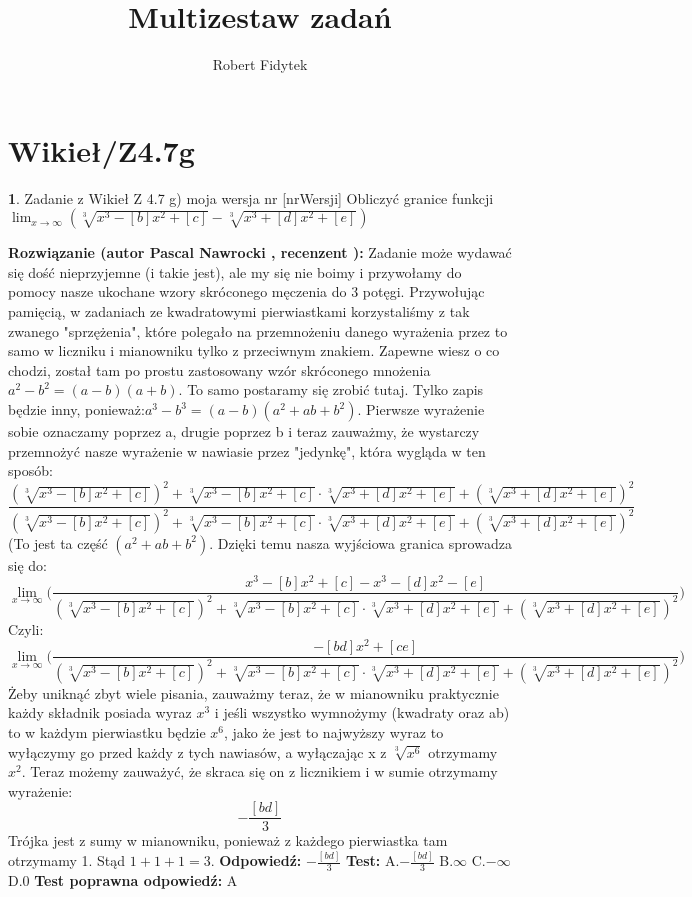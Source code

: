 \documentclass[12pt, a4paper]{article}
\title{Multizestaw zadań}
\author{Robert Fidytek}
\date{}
\theoremstyle{definition} %
\newtheorem{zad}{}
\newcommand{\kategoria}[1]{\section{#1}} %
\newcommand{\zadStart}[1]{\begin{zad}#1\newline} %
\newcommand{\zadStop}{\end{zad}}   %
\newcommand{\rozwStart}[2]{\noindent \textbf{Rozwiązanie (autor #1 , recenzent #2): }\newline} %
\newcommand{\rozwStop}{\newline}                                            %
\newcommand{\odpStart}{\noindent \textbf{Odpowiedź:}\newline}    %
\newcommand{\odpStop}{\newline}                                             %
\newcommand{\testStart}{\noindent \textbf{Test:}\newline} %
\newcommand{\testStop}{\newline} %
\newcommand{\kluczStart}{\noindent \textbf{Test poprawna odpowiedź:}\newline} %
\newcommand{\kluczStop}{\newline} %
\begin{document}
\maketitle


\kategoria{Wikieł/Z4.7g}
\zadStart{Zadanie z Wikieł Z 4.7 g) moja wersja nr [nrWersji]}
Obliczyć granice funkcji $\displaystyle{\lim_{x \to \infty}}(\sqrt[3]{x^3-[b]x^2+[c]}-\sqrt[3]{x^3+[d]x^2+[e]})$
\zadStop
\rozwStart{Pascal Nawrocki}{}
Zadanie może wydawać się dość nieprzyjemne (i takie jest), ale my się nie boimy i przywołamy do pomocy nasze ukochane wzory skróconego męczenia do 3 potęgi. Przywołując pamięcią, w zadaniach ze kwadratowymi pierwiastkami korzystaliśmy z tak zwanego "sprzężenia", które polegało na przemnożeniu danego wyrażenia przez to samo w liczniku i mianowniku tylko z przeciwnym znakiem. Zapewne wiesz o co chodzi, został tam po prostu zastosowany wzór skróconego mnożenia $a^2-b^2=(a-b)(a+b)$. To samo postaramy się zrobić tutaj. Tylko zapis będzie inny, ponieważ:$a^3-b^3=(a-b)(a^2+ab+b^2)$. Pierwsze wyrażenie sobie oznaczamy poprzez a, drugie poprzez b i teraz zauważmy, że wystarczy przemnożyć nasze wyrażenie w nawiasie przez "jedynkę", która wygląda w ten sposób:
$$\frac{(\sqrt[3]{x^3-[b]x^2+[c]})^2+\sqrt[3]{x^3-[b]x^2+[c]}\cdot\sqrt[3]{x^3+[d]x^2+[e]}+(\sqrt[3]{x^3+[d]x^2+[e]})^2}{(\sqrt[3]{x^3-[b]x^2+[c]})^2+\sqrt[3]{x^3-[b]x^2+[c]}\cdot\sqrt[3]{x^3+[d]x^2+[e]}+(\sqrt[3]{x^3+[d]x^2+[e]})^2}$$
(To jest ta część $(a^2+ab+b^2)$.
Dzięki temu nasza wyjściowa granica sprowadza się do:
$$\displaystyle{\lim_{x \to \infty}}\bigg(\frac{x^3-[b]x^2+[c]-x^3-[d]x^2-[e]}{(\sqrt[3]{x^3-[b]x^2+[c]})^2+\sqrt[3]{x^3-[b]x^2+[c]}\cdot\sqrt[3]{x^3+[d]x^2+[e]}+(\sqrt[3]{x^3+[d]x^2+[e]})^2}\bigg)$$
Czyli:
$$\displaystyle{\lim_{x \to \infty}}\bigg(\frac{-[bd]x^2+[ce]}{(\sqrt[3]{x^3-[b]x^2+[c]})^2+\sqrt[3]{x^3-[b]x^2+[c]}\cdot\sqrt[3]{x^3+[d]x^2+[e]}+(\sqrt[3]{x^3+[d]x^2+[e]})^2}\bigg)$$
Żeby uniknąć zbyt wiele pisania, zauważmy teraz, że w mianowniku praktycznie każdy składnik posiada wyraz $x^3$ i jeśli wszystko wymnożymy (kwadraty oraz ab) to w każdym pierwiastku będzie $x^6$, jako że jest to najwyższy wyraz to wyłączymy go przed każdy z tych nawiasów, a wyłączając x z $\sqrt[3]{x^6}$ otrzymamy $x^2$. Teraz możemy zauważyć, że skraca się on z licznikiem i w sumie otrzymamy wyrażenie:
$$-\frac{[bd]}{3}$$ Trójka jest z sumy w mianowniku, ponieważ z każdego pierwiastka tam otrzymamy 1. Stąd $1+1+1=3$.
\rozwStop
\odpStart
$-\frac{[bd]}{3}$
\odpStop
\testStart
A.$-\frac{[bd]}{3}$
B.$\infty$
C.$-\infty$
D.$0$
\testStop
\kluczStart
A
\kluczStop
\end{document}
